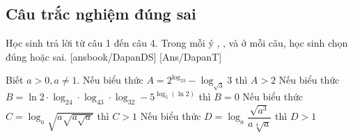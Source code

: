 \subsection{Câu trắc nghiệm đúng sai}
Học sinh trả lời từ câu 1 đến câu 4.
Trong mỗi ý , ,  và  ở mỗi câu, học sinh chọn đúng hoặc sai.
\setcounter{ex}{0}
\LGexTF
{}[ansbook/DapanDS]
[Ans/DapanT]
\begin{ex}%
	Biết ${a>0, a \neq 1}$.
	\choiceTF
	{Nếu biểu thức $A=2^{\log_23} - \log_{\sqrt{3}}3$ thì $A>2$}
	{\True Nếu biểu thức $B=\ln 2\cdot \log_24\cdot \log_43\cdot \log_32 - 5^{\log_5(\ln 2)}$ thì $B=0$}
	{Nếu biểu thức $C=\log_a\sqrt{a\sqrt{a\sqrt{a}}}$ thì $C>1$}
	{Nếu biểu thức $D=\log_a\dfrac{\sqrt{a^3}}{a\sqrt[4]{a}}$ thì $D>1$}
\end{ex}
